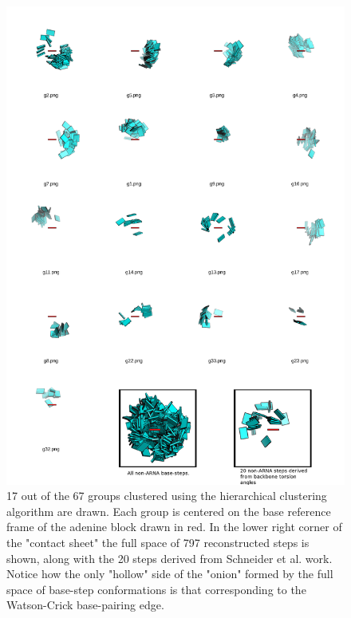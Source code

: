\begin{figure}
\centering
\includegraphics[angle=0, scale=0.32]{Chapter2/k67_17.png}
\caption{17  out of  the 67  groups clustered  using  the hierarchical
  clustering algorithm are  drawn. Each group is centered  on the base
  reference frame  of the  adenine block drawn  in red.  In  the lower
  right  corner  of  the  "contact   sheet"  the  full  space  of  797
  reconstructed steps is  shown, along with the 20  steps derived from
  Schneider  et al. work.  Notice how  the only  "hollow" side  of the
  "onion" formed by the full  space of base-step conformations is that
  corresponding to the Watson-Crick base-pairing edge.}
\label{fig:noarnak67}
\end{figure}

